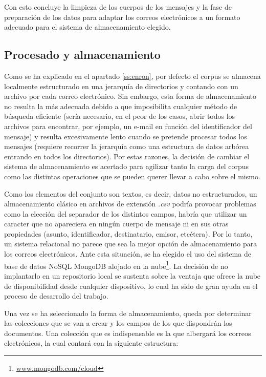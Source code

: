 Con esto concluye la limpieza de los cuerpos de los mensajes y la fase de preparación de los datos para adaptar los correos electrónicos a un formato adecuado para el sistema de almacenamiento elegido.

\subsection{Procesado y almacenamiento}\label{ss:almacen}

Como se ha explicado en el apartado \ref{ss:enron}, por defecto el corpus se almacena localmente estructurado en una jerarquía de directorios y contando con un archivo por cada correo electrónico. Sin embargo, esta forma de almacenamiento no resulta la más adecuada debido a que imposibilita cualquier método de búsqueda eficiente (sería necesario, en el peor de los casos, abrir todos los archivos para encontrar, por ejemplo, un e-mail en función del identificador del mensaje) y resulta excesivamente lento cuando se pretende procesar todos los mensajes (requiere recorrer la jerarquía como una estructura de datos arbórea entrando en todos los directorios). Por estas razones, la decisión de cambiar el sistema de almacenamiento es acertado para agilizar tanto la carga del corpus como las distintas operaciones que se pueden querer llevar a cabo sobre el mismo.

Como los elementos del conjunto son textos, es decir, datos no estructurados, un almacenamiento clásico en archivos de extensión \textit{.csv} podría provocar problemas como la elección del separador de los distintos campos, habría que utilizar un caracter que no apareciera en ningún cuerpo de mensaje ni en sus otras propiedades (asunto, identificador, destinatario, emisor, etcétera). Por lo tanto, un sistema relacional no parece que sea la mejor opción de almacenamiento para los correos electrónicos. Ante esta situación, se ha elegido el uso del sistema de base de datos NoSQL MongoDB alojado en la nube\footnote{\url{www.mongodb.com/cloud}}. La decisión de no implantarlo en un repositorio local se sustenta sobre la ventaja que ofrece la nube de disponibilidad desde cualquier dispositivo, lo cual ha sido de gran ayuda en el proceso de desarrollo del trabajo.

Una vez se ha seleccionado la forma de almacenamiento, queda por determinar las colecciones que se van a crear y los campos de los que dispondrán los documentos. Una colección que es indispensable es la que albergará los correos electrónicos, la cual contará con la siguiente estructura:


